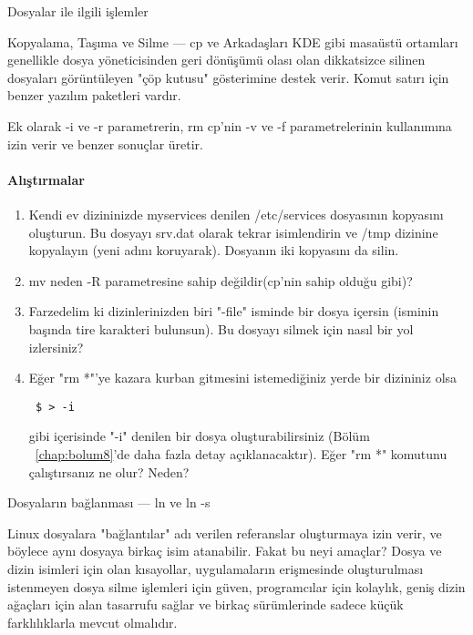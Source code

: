 \begin{section}{Dosyalar ile ilgili işlemler}
\begin{subsection}{Kopyalama, Taşıma ve Silme — cp ve Arkadaşları}
KDE gibi masaüstü ortamları genellikle dosya yöneticisinden geri dönüşümü olası olan dikkatsizce silinen dosyaları görüntüleyen "çöp kutusu" gösterimine destek verir. Komut satırı için benzer yazılım paketleri vardır.

Ek olarak -i ve -r parametrerin, rm cp'nin -v ve -f parametrelerinin kullanımına izin verir ve benzer sonuçlar üretir.

\paragraph{{\Huge{\PencilLeftDown}}Alıştırmalar}{
\begin{enumerate}
 \item Kendi ev dizininizde myservices denilen /etc/services dosyasının kopyasını oluşturun. Bu dosyayı srv.dat olarak tekrar isimlendirin ve /tmp dizinine kopyalayın (yeni adını koruyarak). Dosyanın iki kopyasını da silin.
 \item mv neden -R parametresine sahip değildir(cp'nin sahip olduğu gibi)?
 \item Farzedelim ki dizinlerinizden biri "-file" isminde bir dosya içersin (isminin başında tire karakteri bulunsun). Bu dosyayı silmek için nasıl bir yol izlersiniz?
 \item Eğer "rm *"'ye kazara kurban gitmesini istemediğiniz yerde bir dizininiz olsa \begin{verbatim}
 $ > -i
 \end{verbatim}gibi içerisinde "-i" denilen bir dosya oluşturabilirsiniz (Bölüm ~\ref{chap:bolum8}'de daha fazla detay açıklanacaktır). Eğer "rm *" komutunu çalıştırsanız ne olur? Neden?
\end{enumerate}}
\end{subsection}
\begin{subsection}{Dosyaların bağlanması — ln ve ln -s}
\label{sec:bolum642}

Linux dosyalara "bağlantılar" adı verilen referanslar oluşturmaya izin verir, ve böylece aynı dosyaya birkaç isim atanabilir. Fakat bu neyi amaçlar? Dosya ve dizin isimleri için olan kısayollar, uygulamaların erişmesinde oluşturulması istenmeyen dosya silme işlemleri için güven, programcılar için kolaylık, geniş dizin ağaçları için alan tasarrufu sağlar ve birkaç sürümlerinde sadece küçük farklılıklarla mevcut olmalıdır.


\end{subsection}
\end{section}
